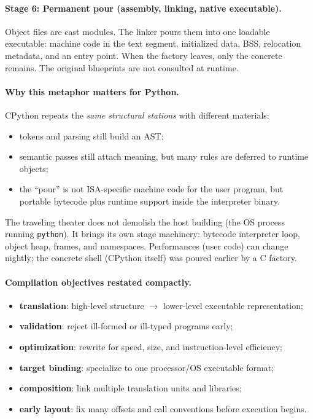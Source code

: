 \documentclass[a4paper,twoside]{report}
\begin{document}
\paragraph{Stage 6: Permanent pour (assembly, linking, native executable).}
Object files are cast modules. The linker pours them into one loadable executable: machine code in the text segment, initialized data, BSS, relocation metadata, and an entry point. When the factory leaves, only the concrete remains. The original blueprints are not consulted at runtime.

\paragraph{Why this metaphor matters for Python.}
CPython repeats the \emph{same structural stations} with different materials:
\begin{itemize}
    \item tokens and parsing still build an AST;
    \item semantic passes still attach meaning, but many rules are deferred to runtime objects;
    \item the ``pour'' is not ISA-specific machine code for the user program, but portable bytecode plus runtime support inside the interpreter binary.
\end{itemize}

The traveling theater does not demolish the host building (the OS process running \texttt{python}). It brings its own stage machinery: bytecode interpreter loop, object heap, frames, and namespaces. Performances (user code) can change nightly; the concrete shell (CPython itself) was poured earlier by a C factory.

\paragraph{Compilation objectives restated compactly.}
\begin{itemize}
    \item \textbf{translation}: high-level structure $\rightarrow$ lower-level executable representation;
    \item \textbf{validation}: reject ill-formed or ill-typed programs early;
    \item \textbf{optimization}: rewrite for speed, size, and instruction-level efficiency;
    \item \textbf{target binding}: specialize to one processor/OS executable format;
    \item \textbf{composition}: link multiple translation units and libraries;
    \item \textbf{early layout}: fix many offsets and call conventions before execution begins.
\end{itemize}
\end{document}
